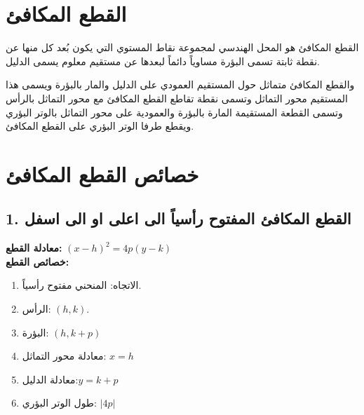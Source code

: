 \section*{القطع المكافئ}

القطع المكافئ هو المحل الهندسي لمجموعة نقاط المستوي التي يكون بُعد كل منها عن نقطة ثابتة تسمى البؤرة مساوياً دائماً لبعدها عن مستقيم معلوم يسمى الدليل.

والقطع المكافئ متماثل حول المستقيم العمودي على الدليل والمار بالبؤرة ويسمى هذا المستقيم محور التماثل وتسمى نقطة تقاطع القطع المكافئ مع محور التماثل بالرأس وتسمى القطعة المستقيمة المارة بالبؤرة والعمودية على محور التماثل بالوتر البؤري ويقطع طرفا الوتر البؤري على القطع المكافئ.

\section{خصائص القطع المكافئ}

\subsection*{1. القطع المكافئ المفتوح رأسياً الى اعلى او الى اسفل}
\textbf{معادلة القطع:} \quad $(x-h)^2 = 4p(y-k)$\\[10pt]
\textbf{خصائص القطع:} 
\begin{enumerate}
	\item الاتجاه: \quad المنحني مفتوح رأسياً.
	\item الرأس: \quad $(h, k)$.
	\item البؤرة: \quad $(h, k+p)$
	\item معادلة محور التماثل:  \quad $x=h$
	\item معادلة الدليل:\quad $y=k+p$
	\item طول الوتر البؤري: \quad $|4p|$
\end{enumerate}

